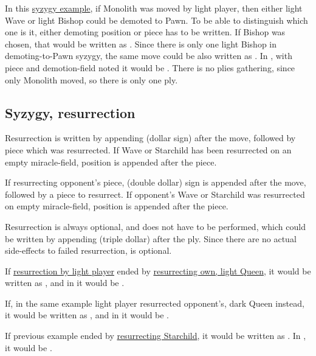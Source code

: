 In this \hyperref[fig:scn_d_22_syzygy_2_stars_init]{syzygy example}, if Monolith was
moved by light player, then either light Wave or light Bishop could be demoted to Pawn.
To be able to distinguish which one is it, either demoting position or piece has to be
written. If Bishop was chosen, that would be written as . Since there is
only one light Bishop in demoting-to-Pawn syzygy, the same move could be also written
as . In , with piece and demotion-field noted it would be
. There is no plies gathering, since only Monolith moved, so there
is only one ply.

\subsection*{Syzygy, resurrection}
\label{sec:Appendix/Notation/Syzygy, resurrection}


Resurrection is written by appending \alg{\$} (dollar sign) after the move, followed
by piece which was resurrected. If Wave or Starchild has been resurrected on an empty
miracle-field, position is appended after the piece.

If resurrecting opponent's piece, \alg{\$\$} (double dollar) sign is appended after
the move, followed by a piece to resurrect. If opponent's Wave or Starchild was
resurrected on empty miracle-field, position is appended after the piece.

Resurrection is always optional, and does not have to be performed, which could
be written by appending \alg{\$\$\$} (triple dollar) after the ply. Since there
are no actual side-effects to failed resurrection, \alg{\$\$\$} is optional.

If \hyperref[fig:scn_o_51_syzygy_starchild_init]{resurrection by light player} ended by
\hyperref[fig:scn_o_52_syzygy_starchild_end]{resurrecting own, light Queen}, it would be
written as , and in  it would be .

If, in the same example light player resurrected opponent's, dark Queen instead, it would
be written as , and in  it would be .

If previous example ended by
\hyperref[fig:scn_o_53_syzygy_starchild_resurrection]{resurrecting Starchild}, it would
be written as . In , it would be .

